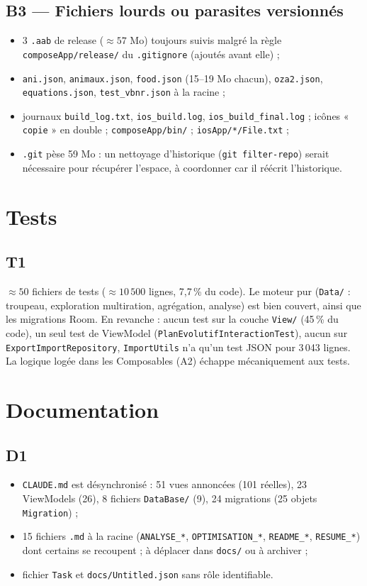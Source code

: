 \documentclass[11pt,a4paper]{article}
\newcommand{\code}[1]{\texttt{#1}}
\newcommand{\prio}[1]{\textbf{\textcolor{#1}{\textbullet}}}
\begin{document}
\subsection*{\prio{orange} B3 --- Fichiers lourds ou parasites versionnés}
\begin{itemize}
  \item 3 \code{.aab} de release (\(\approx 57\) Mo) toujours suivis malgré la règle
        \code{composeApp/release/} du \code{.gitignore} (ajoutés avant elle) ;
  \item \code{ani.json}, \code{animaux.json}, \code{food.json} (15--19 Mo chacun), \code{oza2.json},
        \code{equations.json}, \code{test\_vbnr.json} à la racine ;
  \item journaux \code{build\_log.txt}, \code{ios\_build.log}, \code{ios\_build\_final.log} ;
        icônes « \code{copie} » en double ; \code{composeApp/bin/} ; \code{iosApp/*/File.txt} ;
  \item \code{.git} pèse 59 Mo : un nettoyage d'historique (\code{git filter-repo}) serait nécessaire
        pour récupérer l'espace, à coordonner car il réécrit l'historique.
\end{itemize}

\section{Tests}
\subsection*{\prio{orange} T1}
\(\approx 50\) fichiers de tests (\(\approx 10\,500\) lignes, 7,7\,\% du code). Le moteur
pur (\code{Data/} : troupeau, exploration multiration, agrégation, analyse) est bien couvert,
ainsi que les migrations Room. En revanche : aucun test sur la couche \code{View/} (45\,\% du code),
un seul test de ViewModel (\code{PlanEvolutifInteractionTest}), aucun sur
\code{ExportImportRepository}, \code{ImportUtils} n'a qu'un test JSON pour 3\,043 lignes. La logique
logée dans les Composables (A2) échappe mécaniquement aux tests.

\section{Documentation}
\subsection*{\prio{gray} D1}
\begin{itemize}
  \item \code{CLAUDE.md} est désynchronisé : 51 vues annoncées (101 réelles), 23 ViewModels (26),
        8 fichiers \code{DataBase/} (9), 24 migrations (25 objets \code{Migration}) ;
  \item 15 fichiers \code{.md} à la racine (\code{ANALYSE\_*}, \code{OPTIMISATION\_*}, \code{README\_*},
        \code{RESUME\_*}) dont certains se recoupent ; à déplacer dans \code{docs/} ou à archiver ;
  \item fichier \code{Task} et \code{docs/Untitled.json} sans rôle identifiable.
\end{itemize}
\end{document}
